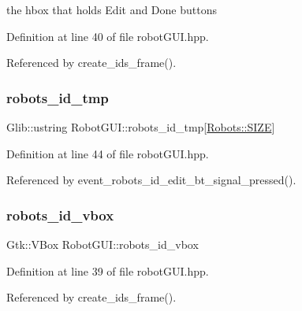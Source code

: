 \begin{DoxyItemize}
\item the hbox that holds Edit and Done buttons 
\end{DoxyItemize}

Definition at line 40 of file robot\+G\+U\+I.\+hpp.



Referenced by create\+\_\+ids\+\_\+frame().

\mbox{\label{class_robot_g_u_i_ab5811cf4bb3982cdba9adf282eb52517}} 
\subsubsection{\texorpdfstring{robots\+\_\+id\+\_\+tmp}{robots\_id\_tmp}}
{\footnotesize\ttfamily Glib\+::ustring Robot\+G\+U\+I\+::robots\+\_\+id\+\_\+tmp\mbox{[}\hyperlink{class_robots_ae9df2f1d345ad6740f0459956cdd4712}{Robots\+::\+S\+I\+ZE}\mbox{]}\hspace{0.3cm}{\ttfamily [private]}}



Definition at line 44 of file robot\+G\+U\+I.\+hpp.



Referenced by event\+\_\+robots\+\_\+id\+\_\+edit\+\_\+bt\+\_\+signal\+\_\+pressed().

\mbox{\label{class_robot_g_u_i_ac64edc58bf0527d05a792fbe59237f32}} 
\subsubsection{\texorpdfstring{robots\+\_\+id\+\_\+vbox}{robots\_id\_vbox}}
{\footnotesize\ttfamily Gtk\+::\+V\+Box Robot\+G\+U\+I\+::robots\+\_\+id\+\_\+vbox\hspace{0.3cm}{\ttfamily [private]}}



Definition at line 39 of file robot\+G\+U\+I.\+hpp.



Referenced by create\+\_\+ids\+\_\+frame().

